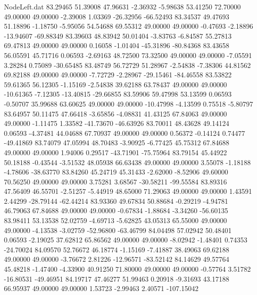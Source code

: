 \begin{filecontents}{NodeLeft.dat}
  83.29465   51.39008   47.96631    -2.36932   -5.98638   53.41250   72.70000   49.00000   49.00000   -2.39008    1.03369  -26.32956  -66.52493
  83.34537   49.47693   51.18896    -1.18750   -5.95056   54.54688   69.55312   49.00000   49.00000   -0.47693   -2.18896  -13.94607  -69.88349
  83.39603   48.83942   50.01404    -3.83763   -6.84587   55.27813   69.47813   49.00000   49.00000    0.16058   -1.01404  -45.31896  -80.84368
  83.43658   56.05591   45.71716     0.06593   -2.69163   48.72500   73.32500   49.00000   49.00000   -7.05591    3.28284    0.75089  -30.65485
  83.48749   56.72729   51.28967    -2.54838   -7.38306   44.81562   69.82188   49.00000   49.00000   -7.72729   -2.28967  -29.15461  -84.46558
  83.53822   59.61365   56.12305    -1.15169   -2.54838   39.62188   63.78437   49.00000   49.00000  -10.61365   -7.12305  -13.40815  -29.66855
  83.59906   59.47998   53.13599     0.06593   -0.50707   35.99688   63.60625   49.00000   49.00000  -10.47998   -4.13599    0.75518   -5.80797
  83.64957   50.11475   47.66418    -3.65856   -4.08831   41.43125   67.84063   49.00000   49.00000   -1.11475    1.33582  -41.73670  -46.63926
  83.70011   48.43628   49.14124     0.06593   -4.37481   44.04688   67.70937   49.00000   49.00000    0.56372   -0.14124    0.74477  -49.41869
  83.74079   47.05994   48.70483    -3.90925   -6.77425   45.75312   67.84688   49.00000   49.00000    1.94006    0.29517  -43.71901  -75.75964
  83.79154   45.44922   50.18188    -0.43544   -3.51532   48.05938   66.63438   49.00000   49.00000    3.55078   -1.18188   -4.78606  -38.63770
  83.84260   45.24719   45.31433    -2.62000   -8.52906   49.60000   70.56250   49.00000   49.00000    3.75281    3.68567  -30.58211  -99.55584
  83.89316   47.56409   46.55701    -2.51257   -5.44919   48.65000   71.29063   49.00000   49.00000    1.43591    2.44299  -28.79144  -62.44214
  83.93360   49.67834   50.88684    -0.29219   -4.94781   46.79063   67.84688   49.00000   49.00000   -0.67834   -1.88684   -3.34260  -56.60135
  83.98411   53.13538   52.02759    -4.69713   -5.62825   43.05313   65.55000   49.00000   49.00000   -4.13538   -3.02759  -52.96800  -63.46799
  84.04498   57.02942   50.48401     0.06593   -2.19025   37.62812   65.86562   49.00000   49.00000   -8.02942   -1.48401    0.74353  -24.70024
  84.09570   52.76672   46.18774    -1.15169   -7.41887   38.49063   69.62188   49.00000   49.00000   -3.76672    2.81226  -12.96571  -83.52142
  84.14629   49.57764   45.48218    -1.47400   -4.33900   40.91250   71.80000   49.00000   49.00000   -0.57764    3.51782  -16.80531  -49.46951
  84.19717   47.46277   51.99463     0.20918   -9.31693   43.17188   66.95937   49.00000   49.00000    1.53723   -2.99463    2.40571 -107.15042

\end{filecontents}
